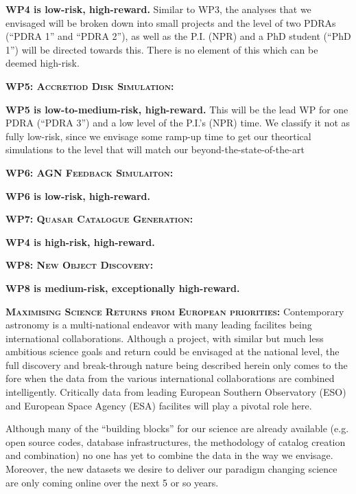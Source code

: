 \documentclass[oneside, a4paper, onecolumn, 11pt]{article}
\begin{document}
\noindent
{\bf WP4 is low-risk, high-reward.}
Similar to WP3, the analyses that we envisaged will be broken down
into small projects and the level of two PDRAs (``PDRA 1'' and ``PDRA
2''), as well as the P.I. (NPR) and a PhD student (``PhD 1'') will be
directed towards this. There is no element of this which can be deemed
high-risk.


\smallskip
\smallskip
\noindent
\textbf{\textsc{WP5: Accretiod Disk Simulation:}} 


\noindent
{\bf WP5 is low-to-medium-risk, high-reward.}
This will be the lead WP for one PDRA (``PDRA 3'') and a low level of the P.I.'s (NPR) time. We classify it not as fully low-risk, since we envisage some ramp-up time to get our theortical simulations to the level that will match our beyond-the-state-of-the-art 

\smallskip
\smallskip
\noindent
\textbf{\textsc{WP6: AGN Feedback Simulaiton:}} 

\noindent
{\bf WP6 is low-risk, high-reward.}



\smallskip
\smallskip
\noindent
\textbf{\textsc{WP7: Quasar Catalogue Generation:}} 

\noindent
{\bf WP4 is high-risk, high-reward.}


\textbf{\textsc{WP8: New Object Discovery:}} 

\noindent
{\bf WP8 is medium-risk, exceptionally high-reward.}







\smallskip
\smallskip
\noindent
\textbf{\textsc{Maximising Science Returns from European priorities:}}
Contemporary astronomy is a multi-national endeavor with many leading
facilites being international collaborations. Although a project, with
similar but much less ambitious science goals and return could be
envisaged at the national level, the full discovery and break-through
nature being described herein only comes to the fore when the data
from the various international collaborations are combined
intelligently.  Critically data from leading European Southern
Observatory (ESO) and European Space Agency (ESA) facilites will play
a pivotal role here.

\smallskip
\smallskip
\noindent
Although many of the ``building blocks'' for our science are already
available (e.g. open source codes, database infrastructures, the
methodology of catalog creation and combination) no one has yet to
combine the data in the way we envisage. Moreover, the new datasets we
desire to deliver our paradigm changing science are only coming online
over the next 5 or so years.
\end{document}
